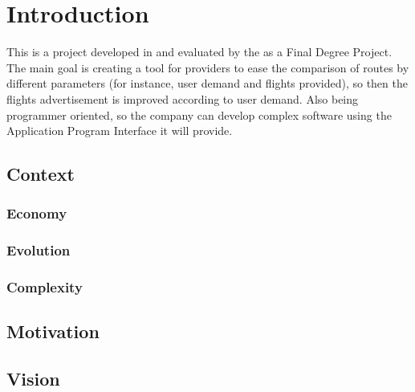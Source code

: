 
\chapter{Introduction}

\label{chapter01}

This is a project developed in \textit{\company} and evaluated by the \textit{\univname} as a Final Degree Project. The main goal is creating a tool for \textit{\company} providers to ease the comparison of routes by different parameters (for instance, user demand and flights provided), so then the flights advertisement is improved according to user demand. Also being programmer oriented, so the company can develop complex software using the Application Program Interface it will provide.

\section{Context}



\subsection{Economy}

\subsection{Evolution}

\subsection{Complexity}

\section{Motivation}

\section{Vision}